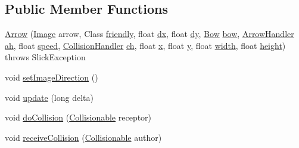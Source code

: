 \subsection*{Public Member Functions}
\begin{DoxyCompactItemize}
\item 
\mbox{\hyperlink{classitems_1_1weapons_1_1_arrow_af78ba07ad4164f9ad7b5f5380224c4ce}{Arrow}} (\mbox{\hyperlink{classorg_1_1newdawn_1_1slick_1_1_image}{Image}} arrow, Class \mbox{\hyperlink{classitems_1_1weapons_1_1_arrow_a3b020ae7197868d31adf452c56fd00ec}{friendly}}, float \mbox{\hyperlink{classitems_1_1weapons_1_1_arrow_ad0f19f917fe7af158738ad8dadc0d0eb}{dx}}, float \mbox{\hyperlink{classitems_1_1weapons_1_1_arrow_a41b7f69adb414e3b19c40785b6225b9c}{dy}}, \mbox{\hyperlink{classitems_1_1weapons_1_1_bow}{Bow}} \mbox{\hyperlink{classitems_1_1weapons_1_1_arrow_a40f42a19ccd51554f27628716170d1f3}{bow}}, \mbox{\hyperlink{classitems_1_1weapons_1_1_arrow_handler}{Arrow\+Handler}} \mbox{\hyperlink{classitems_1_1weapons_1_1_arrow_a53eef20648312917e2c7b4405cd24c2c}{ah}}, float \mbox{\hyperlink{classentities_1_1_mobile_entity_a815a9d2b23a0bb7e3ee7739d4c10d7c3}{speed}}, \mbox{\hyperlink{classentities_1_1_collision_handler}{Collision\+Handler}} \mbox{\hyperlink{classitems_1_1weapons_1_1_arrow_aca68c367f384774a6c0dc1c123ca4138}{ch}}, float \mbox{\hyperlink{classorg_1_1newdawn_1_1slick_1_1geom_1_1_shape_a3e985bfff386c15a4efaad03d8ad60d3}{x}}, float \mbox{\hyperlink{classorg_1_1newdawn_1_1slick_1_1geom_1_1_shape_a9f934baded6a1b65ebb69e7e5f80ea00}{y}}, float \mbox{\hyperlink{classorg_1_1newdawn_1_1slick_1_1geom_1_1_rectangle_a967e1823f62daf45abb142779d1be62d}{width}}, float \mbox{\hyperlink{classorg_1_1newdawn_1_1slick_1_1geom_1_1_rectangle_a3bd010fdce636fc11ed0e0ad4d4b4a0a}{height}})  throws Slick\+Exception 
\item 
void \mbox{\hyperlink{classitems_1_1weapons_1_1_arrow_a0382492d0b384efe35b57bd18d9cf20c}{set\+Image\+Direction}} ()
\item 
void \mbox{\hyperlink{classitems_1_1weapons_1_1_arrow_a4c0bb33aa961f0e0f4e9437003216275}{update}} (long delta)
\item 
void \mbox{\hyperlink{classitems_1_1weapons_1_1_arrow_aab7e6b254eafcc351c445269351900c0}{do\+Collision}} (\mbox{\hyperlink{interfaceentities_1_1_collisionable}{Collisionable}} receptor)
\item 
void \mbox{\hyperlink{classitems_1_1weapons_1_1_arrow_ae73288a331d5f87316ddf1f6e7d113ca}{receive\+Collision}} (\mbox{\hyperlink{interfaceentities_1_1_collisionable}{Collisionable}} author)
\end{DoxyCompactItemize}
